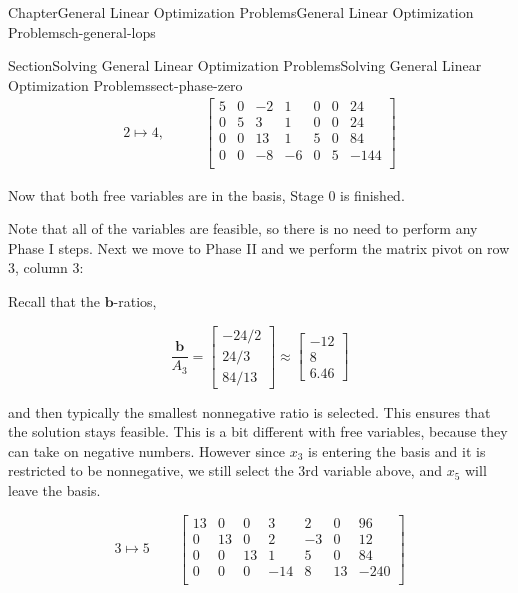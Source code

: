 \documentclass[oneside,10pt,]{book}
\numberwithin{equation}{section}
\newcommand{\amp}{&}
\begin{document}
\begin{chapterptx}{Chapter}{General Linear Optimization Problems}{}{General Linear Optimization Problems}{}{}{ch-general-lops}
\begin{sectionptx}{Section}{Solving General Linear Optimization Problems}{}{Solving General Linear Optimization Problems}{}{}{sect-phase-zero}
\begin{align*}
2 \mapsto 4, \qquad \amp \left[\begin{array}{rr|rrrr|r}  5 \amp 0 \amp -2 \amp 1 \amp 0 \amp 0 \amp 24\\ 0 \amp 5 \amp 3 \amp 1 \amp 0 \amp 0 \amp 24\\ 0 \amp 0 \amp 13 \amp 1 \amp 5 \amp 0 \amp 84\\ \hline 0 \amp 0 \amp -8 \amp -6 \amp 0 \amp 5 \amp -144\\ \end{array} \right]
\end{align*}
%
\par
Now that both free variables are in the basis, Stage 0 is finished.%
\par
Note that all of the variables are feasible, so there is no need to perform any Phase I steps. Next we move to Phase II and we perform the matrix pivot on row 3, column 3:%
\par
Recall that the \(\boldsymbol{b}\)-ratios,%
\par
%
\begin{equation*}
\frac{\boldsymbol{b}}{A_3} = \begin{bmatrix} -24/2 \\ 24/3 \\ 84/13 \end{bmatrix} \approx \begin{bmatrix} -12 \\ 8 \\ 6.46 \end{bmatrix}
\end{equation*}
%
\par
and then typically the smallest nonnegative ratio is selected. This ensures that the solution stays feasible. This is a bit different with free variables, because they can take on negative numbers. However since \(x_3\) is entering the basis and it is restricted to be nonnegative, we still select the 3rd variable above, and \(x_5\) will leave the basis.%
\par
%
\begin{equation*}
3 \mapsto 5 \qquad \left[\begin{array}{rr|rrrr|r} 13 \amp 0 \amp 0 \amp 3 \amp 2 \amp 0 \amp 96\\ 0 \amp 13 \amp 0 \amp 2 \amp -3 \amp 0 \amp 12\\ 0 \amp 0 \amp 13 \amp 1 \amp 5 \amp 0 \amp 84\\ \hline 0 \amp 0 \amp 0 \amp -14 \amp 8 \amp 13 \amp -240\\ \end{array} \right]

\end{equation*}
\end{sectionptx}
\end{chapterptx}
\end{document}
